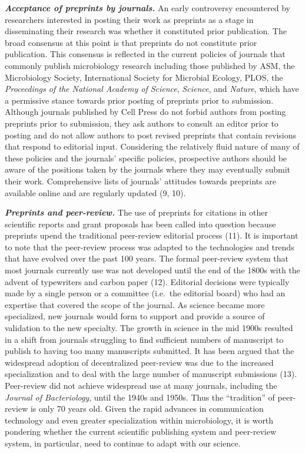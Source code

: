 \documentclass[11pt,]{article}
\begin{document}
\textbf{\emph{Acceptance of preprints by journals.}} An early
controversy encountered by researchers interested in posting their work
as preprints as a stage in disseminating their research was whether it
constituted prior publication. The broad consensus at this point is that
preprints do not constitute prior publication. This consensus is
reflected in the current policies of journals that commonly publish
microbiology research including those published by ASM, the Microbiology
Society, International Society for Microbial Ecology, PLOS, the
\emph{Proceedings of the National Academy of Science}, \emph{Science},
and \emph{Nature}, which have a permissive stance towards prior posting
of preprints prior to submission. Although journals published by Cell
Press do not forbid authors from posting preprints prior to submission,
they ask authors to consult an editor prior to posting and do not allow
authors to post revised preprints that contain revisions that respond to
editorial input. Considering the relatively fluid nature of many of
these policies and the journals' specific policies, prospective authors
should be aware of the positions taken by the journals where they may
eventually submit their work. Comprehensive lists of journals' attitudes
towards preprints are available online and are regularly updated (9,
10).

\textbf{\emph{Preprints and peer-review.}} The use of preprints for
citations in other scientific reports and grant proposals has been
called into question because preprints upend the traditional peer-review
editorial process (11). It is important to note that the peer-review
process was adapted to the technologies and trends that have evolved
over the past 100 years. The formal peer-review system that most
journals currently use was not developed until the end of the 1800s with
the advent of typewriters and carbon paper (12). Editorial decisions
were typically made by a single person or a committee (i.e.~the
editorial board) who had an expertise that covered the scope of the
journal. As science became more specialized, new journals would form to
support and provide a source of validation to the new specialty. The
growth in science in the mid 1900s resulted in a shift from journals
struggling to find sufficient numbers of manuscript to publish to having
too many manuscripts submitted. It has been argued that the widespread
adoption of decentralized peer-review was due to the increased
specialization and to deal with the large number of manuscript
submissions (13). Peer-review did not achieve widespread use at many
journals, including the \emph{Journal of Bacteriology}, until the 1940s
and 1950s. Thus the ``tradition'' of peer-review is only 70 years old.
Given the rapid advances in communication technology and even greater
specialization within microbiology, it is worth pondering whether the
current scientific publishing system and peer-review system, in
particular, need to continue to adapt with our science.
\end{document}
